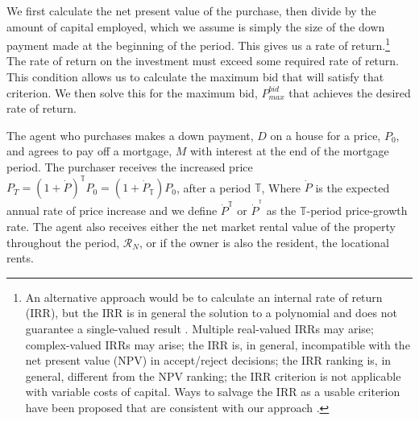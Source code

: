{We first calculate the net present value of the purchase, then divide by the amount of capital employed, which we assume is simply the size of the down payment made at the beginning of the period. This gives us a rate of return.\footnote{An alternative approach would be to calculate an \gls{internal rate of return} (IRR), but the IRR is in general the solution to a polynomial and does not guarantee a single-valued result \cite{robinsonOptimalTerminationIRR1996}. Multiple real-valued  IRRs may arise;  complex-valued IRRs may arise;  the IRR is, in general, incompatible with the \gls{net present value} (NPV) in accept/reject decisions; the IRR ranking is, in general, different from the NPV ranking; the IRR criterion is not applicable with variable costs of capital. Ways to salvage the IRR as a usable criterion have been proposed that are consistent with our approach \cite{magniAverageInternalRate2010}.} The rate of return on the investment must exceed some required rate of return. This condition allows us to calculate the maximum bid that will satisfy that criterion.}
We then solve this for the maximum bid, $P_{max}^{bid}$ that achieves the desired rate of return. 




The agent who purchases makes a down payment, $D$ on a house for a price, $P_0$, and agrees to pay off a mortgage, $M$ with interest at the end of the mortgage period.  The purchaser  receives the increased price 
$P_T = (1 + \dot P)^\mathbb{T}P_0 =(1+\dot P_\mathbb{T})P_0 $, 
after a period $\mathbb{T}$, Where $\dot P$  is the expected annual rate of price increase and we define $\dot P^\mathbb{T}$
or $\dot P^{^\mathbb{T}}$ 
as the $\mathbb{T}$-period  price-growth rate. The agent also receives either the net market rental value of the property throughout the period, $\mathcal{R}_N$, or if the owner is also the resident, the locational rents. 
 
